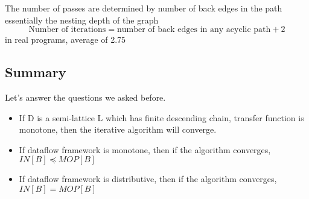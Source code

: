 The number of passes are determined by number of back edges in the path essentially the nesting depth of the graph
\[
	\text{Number of iterations} = \text{number of back edges in any acyclic
		path} + 2
\]
in	real	programs,	average	of	2.75	


\subsection{Summary}
Let's answer the questions we asked before.
\begin{itemize}
	\item If D is a semi-lattice L which has finite descending chain, transfer function is monotone,
	      then the iterative algorithm will converge.
	\item  If dataflow framework is monotone,  then if the algorithm converges,
	      $IN[B] \preceq  MOP[B] $
	\item If dataflow framework is distributive, then if the algorithm converges,
	      $IN[B] = MOP[B]$
\end{itemize}


